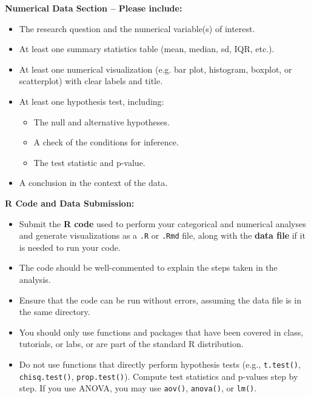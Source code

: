 \documentclass[12pt]{article}
\begin{document}
\vspace{6pt}
\noindent \textbf{Numerical Data Section -- Please include:}
\begin{itemize}
    \item The research question and the numerical variable(s) of interest.
    \item At least one summary statistics table (mean, median, sd, IQR, etc.).
    \item At least one numerical visualization (e.g. bar plot, histogram, boxplot, or scatterplot) with clear labels and title.
    \item At least one hypothesis test, including:
    \begin{itemize}
        \item The null and alternative hypotheses.
        \item A check of the conditions for inference.
        \item The test statistic and p-value.
    \end{itemize}
    \item A conclusion in the context of the data.
\end{itemize}

\vspace{6pt}
\noindent \textbf{R Code and Data Submission:}
\begin{itemize}
    \item Submit the \textbf{R code} used to perform your categorical and numerical analyses and generate visualizations as a \texttt{.R} or \texttt{.Rmd} file, along with the \textbf{data file} if it is needed to run your code.
    \item The code should be well-commented to explain the steps taken in the analysis.
    \item Ensure that the code can be run without errors, assuming the data file is in the same directory.
    \item You should only use functions and packages that have been covered in class, tutorials, or labs, or are part of the standard R distribution.
    \item Do not use functions that directly perform hypothesis tests (e.g., \texttt{t.test()}, \texttt{chisq.test()}, \texttt{prop.test()}). Compute test statistics and p-values step by step. If you use ANOVA, you may use \texttt{aov()}, \texttt{anova()}, or \texttt{lm()}.
\end{itemize}
\end{document}
